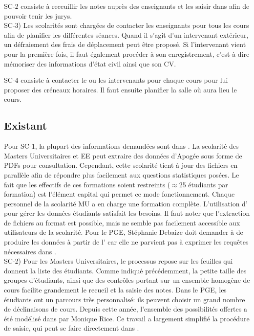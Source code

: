 \documentclass{book}
\begin{document}
SC-2 consiste à receuillir les notes auprès des enseignants et les saisir
dans  afin de pouvoir tenir les jurys.\\


SC-3) Les scolarités sont chargées de contacter les enseignants pour tous
les cours afin de planifier les différentes séances. Quand il s'agit d'un 
intervenant extérieur, un défraiement des frais de déplacement peut être
proposé. Si l'intervenant vient pour la première fois, il faut également 
procéder à son enregistrement, c'est-à-dire mémoriser des informations 
d'état civil ainsi que son CV.

SC-4 consiste à contacter le ou les intervenants pour chaque cours pour
lui proposer des créneaux horaires. Il faut ensuite planifier la salle
où aura lieu le cours.


\subsection{Existant}

Pour SC-1, la plupart des informations demandées sont dans .
La scolarité des Masters Universitaires et EE peut extraire des données
d'Apogée sous forme de PDFs pour consultation. Cependant, cette scolarité
tient à jour des fichiers  en parallèle afin de répondre
plus facilement aux questions statistiques posées. Le fait que les effectifs
de ces formations soient restreints ($\approx$25 étudiants par formation) est 
l'élément capital qui permet ce mode fonctionnement. Chaque personnel
de la scolarité MU a en charge une formation complète. L'utilisation
d' pour gérer les données étudiants satisfait les besoins.
Il faut noter que l'extraction de fichiers au format  est 
possible, mais ne semble pas facilement accessible aux utilisateurs de 
la scolarité.
%
Pour le PGE, Stéphanie Debaize doit demander à \CK de produire les
données à partir de l' car elle ne parvient pas à
exprimer les requêtes nécessaires dans .\\

SC-2) Pour les Masters Universitaires, le processus repose sur les
feuilles  qui donnent la liste des étudiants. Comme
indiqué précédemment, la petite taille des groupes d'étudiants,
ainsi que des contrôles portant sur un ensemble homogène de cours
facilite grandement le recueil et la saisie des notes.
Dans le PGE, les étudiants ont un parcours très personnalisé: ils
peuvent choisir un grand nombre de déclinaisons de cours. Depuis 
cette année, l'ensemble des possibilités offertes a été modélisé
dans  par Monique Rice. Ce travail a largement
simplifié la procédure de saisie, qui peut se faire directement
dans .\\
\end{document}
